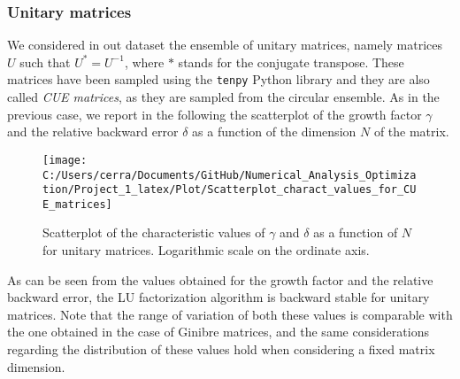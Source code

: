 \documentclass[a4paper,11pt]{report}
\begin{document}
\subsubsection*{Unitary matrices} We considered in out dataset the ensemble of unitary matrices, namely matrices $U$ such that $U^{*} = U^{-1}$, where $*$ stands for the conjugate transpose. These matrices have been sampled using the \texttt{tenpy} Python library and they are also called \textit{CUE matrices}, as they are sampled from the circular ensemble. As in the previous case, we report in the following the scatterplot of the growth factor $\gamma$ and the relative backward error $\delta$ as a function of the dimension $N$ of the matrix.
\begin{figure}[H]
	\centering
	\texttt{[image: C:/Users/cerra/Documents/GitHub/Numerical\_Analysis\_Optimization/Project\_1\_latex/Plot/Scatterplot\_charact\_values\_for\_CUE\_matrices]}
	\caption{Scatterplot of the characteristic values of $\gamma$ and $\delta$ as a function of $N$ for unitary matrices. Logarithmic scale on the ordinate axis.}
	\label{fig:Scatterplot_CUE}
\end{figure}
\noindent As can be seen from the values obtained for the growth factor and the relative backward error, the LU factorization algorithm is backward stable for unitary matrices. Note that the range of variation of both these values is comparable with the one obtained in the case of Ginibre matrices, and the same considerations regarding the distribution of these values hold when considering a fixed matrix dimension.\\
%
\end{document}
